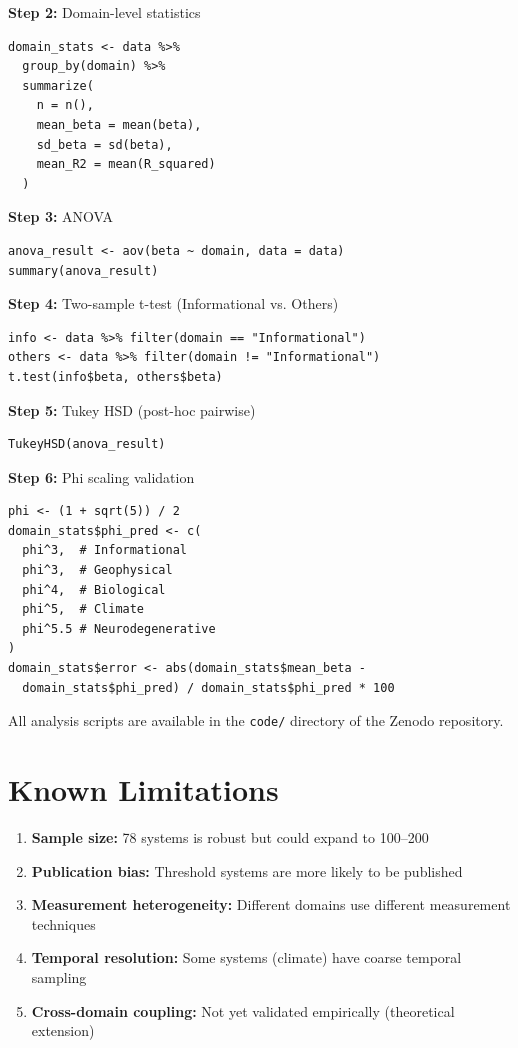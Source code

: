 \documentclass[11pt,a4paper]{article}
\begin{document}
\textbf{Step 2:} Domain-level statistics
\begin{verbatim}
domain_stats <- data %>%
  group_by(domain) %>%
  summarize(
    n = n(),
    mean_beta = mean(beta),
    sd_beta = sd(beta),
    mean_R2 = mean(R_squared)
  )
\end{verbatim}

\textbf{Step 3:} ANOVA
\begin{verbatim}
anova_result <- aov(beta ~ domain, data = data)
summary(anova_result)
\end{verbatim}

\textbf{Step 4:} Two-sample t-test (Informational vs. Others)
\begin{verbatim}
info <- data %>% filter(domain == "Informational")
others <- data %>% filter(domain != "Informational")
t.test(info$beta, others$beta)
\end{verbatim}

\textbf{Step 5:} Tukey HSD (post-hoc pairwise)
\begin{verbatim}
TukeyHSD(anova_result)
\end{verbatim}

\textbf{Step 6:} Phi scaling validation
\begin{verbatim}
phi <- (1 + sqrt(5)) / 2
domain_stats$phi_pred <- c(
  phi^3,  # Informational
  phi^3,  # Geophysical
  phi^4,  # Biological
  phi^5,  # Climate
  phi^5.5 # Neurodegenerative
)
domain_stats$error <- abs(domain_stats$mean_beta - 
  domain_stats$phi_pred) / domain_stats$phi_pred * 100
\end{verbatim}

All analysis scripts are available in the \texttt{code/} directory of the Zenodo repository.

\section{Known Limitations}

\begin{enumerate}
\item \textbf{Sample size:} 78 systems is robust but could expand to 100--200
\item \textbf{Publication bias:} Threshold systems are more likely to be published
\item \textbf{Measurement heterogeneity:} Different domains use different measurement techniques
\item \textbf{Temporal resolution:} Some systems (climate) have coarse temporal sampling
\item \textbf{Cross-domain coupling:} Not yet validated empirically (theoretical extension)
\end{enumerate}
\end{document}
